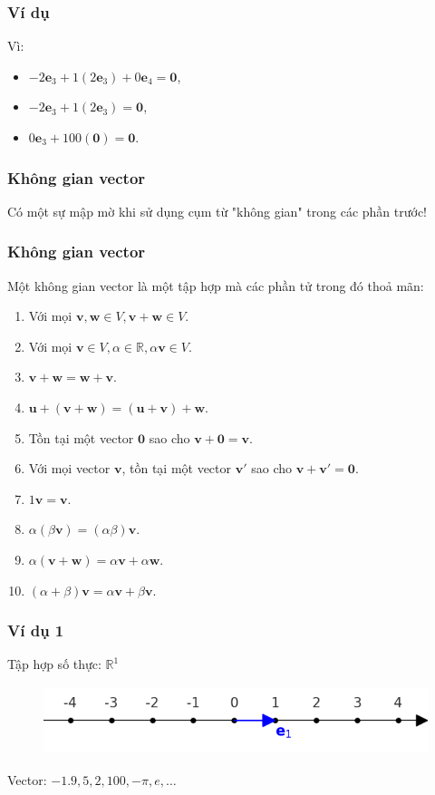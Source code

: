 \begin{frame}
    \frametitle{Ví dụ}
    Vì:
    \begin{itemize}
         \item   \(-2\mathbf{e}_{3}+1(2\mathbf{e}_{3})+0\mathbf{e}_{4}=\mathbf{0}\),
           \item \(-2\mathbf{e}_{3}+1(2\mathbf{e}_{3})=\mathbf{0}\),
        \item    \(0\mathbf{e}_3 +100(\mathbf{0})=\mathbf{0}\).
    \end{itemize}
\end{frame}
\begin{frame}
    \frametitle{Không gian vector}
    Có một sự mập mờ khi sử dụng cụm từ "không gian" trong các phần trước!
\end{frame}
\begin{frame}
    \frametitle{Không gian vector}
    Một không gian vector là một tập hợp mà các phần tử trong đó thoả mãn:
    \begin{enumerate}
        \item Với mọi \(\mathbf{v}, \mathbf{w}\in V , \mathbf{v}+\mathbf{w}\in V\).
        \item Với mọi \(\mathbf{v}\in V, \alpha\in \mathbb{R}, \alpha\mathbf{v}\in V\).
        \item \(\mathbf{v}+\mathbf{w}=\mathbf{w}+\mathbf{v}\).
        \item   \(\mathbf{u}+(\mathbf{v}+\mathbf{w})=(\mathbf{u}+\mathbf{v})+\mathbf{w}\).
        \item Tồn tại một vector \(\mathbf{0}\) sao cho \(\mathbf{v}+\mathbf{0}=\mathbf{v}\).
        \item Với mọi vector \(\mathbf{v}\), tồn tại một vector \(\mathbf{v}'\) sao cho \(\mathbf{v}+\mathbf{v}'=\mathbf{0}\).
        \item \(1\mathbf{v}=\mathbf{v}\).
        \item \(\alpha(\beta\mathbf{v})=(\alpha\beta)\mathbf{v}\).
        \item \(\alpha(\mathbf{v}+\mathbf{w})=\alpha\mathbf{v}+\alpha\mathbf{w}\).
        \item \((\alpha+\beta)\mathbf{v}=\alpha\mathbf{v}+\beta\mathbf{v}\). 
    \end{enumerate}
\end{frame}
\begin{frame}
    \frametitle{Ví dụ 1}
    Tập hợp số thực: \(\mathbb{R}^1\)
    \begin{figure}[H]
        \centering
        \includegraphics[width=12cm, height=2cm]{Slides/Figure/1Dvectorspace.png}
    \end{figure}
    Vector: \(-1.9, 5, 2,100, -\pi, e,\dots\)
\end{frame}
